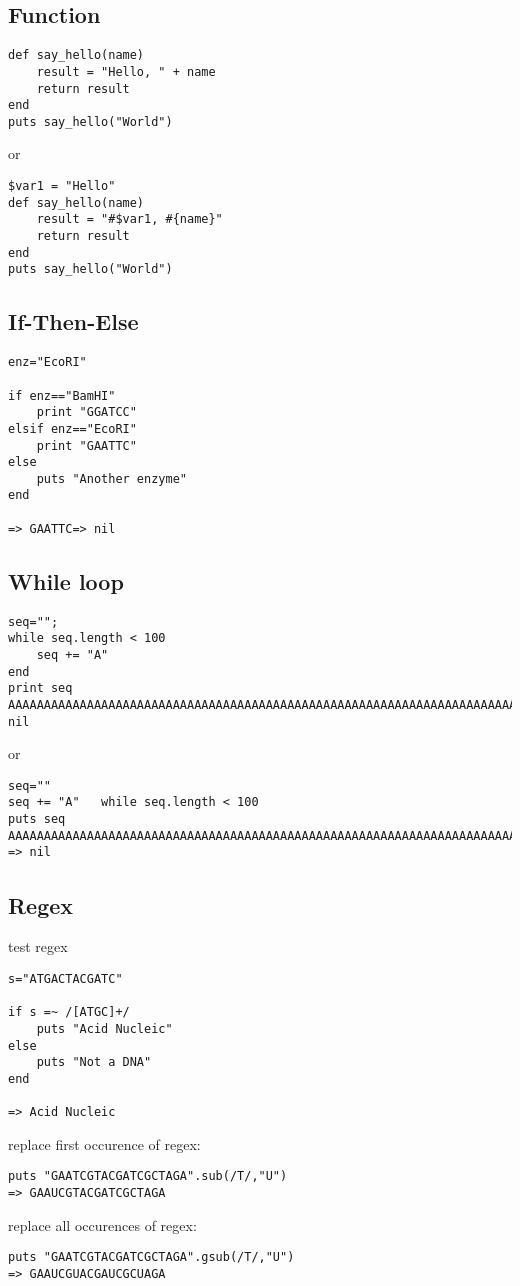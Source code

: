 \documentclass{article}
\begin{document}
\subsection{Function}
\begin{lstlisting}
def say_hello(name)
	result = "Hello, " + name
	return result
end
puts say_hello("World")
\end{lstlisting}
or
\begin{lstlisting}
$var1 = "Hello"
def say_hello(name)
	result = "#$var1, #{name}"
	return result
end
puts say_hello("World")
\end{lstlisting}



\subsection{If-Then-Else}
\begin{lstlisting}
enz="EcoRI"

if enz=="BamHI"
	print "GGATCC"
elsif enz=="EcoRI"
	print "GAATTC"
else
	puts "Another enzyme"
end

=> GAATTC=> nil
\end{lstlisting}

\subsection{While loop}
\begin{lstlisting}
seq="";
while seq.length < 100
	seq += "A"
end
print seq
AAAAAAAAAAAAAAAAAAAAAAAAAAAAAAAAAAAAAAAAAAAAAAAAAAAAAAAAAAAAAAAAAAAAAAAAAAAAAAAAAAAAAAAAAAAAAAAAAAAA=> nil
\end{lstlisting}
or
\begin{lstlisting}
seq=""
seq += "A"   while seq.length < 100
puts seq
AAAAAAAAAAAAAAAAAAAAAAAAAAAAAAAAAAAAAAAAAAAAAAAAAAAAAAAAAAAAAAAAAAAAAAAAAAAAAAAAAAAAAAAAAAAAAAAAAAAA
=> nil
\end{lstlisting}

\subsection{Regex}
test regex
\begin{lstlisting}
s="ATGACTACGATC"

if s =~ /[ATGC]+/
	puts "Acid Nucleic"
else
	puts "Not a DNA"
end

=> Acid Nucleic
\end{lstlisting}

replace first occurence of regex:
\begin{lstlisting}
puts "GAATCGTACGATCGCTAGA".sub(/T/,"U")
=> GAAUCGTACGATCGCTAGA
\end{lstlisting}
replace all occurences of regex:
\begin{lstlisting}
puts "GAATCGTACGATCGCTAGA".gsub(/T/,"U")
=> GAAUCGUACGAUCGCUAGA
\end{lstlisting}
\end{document}
